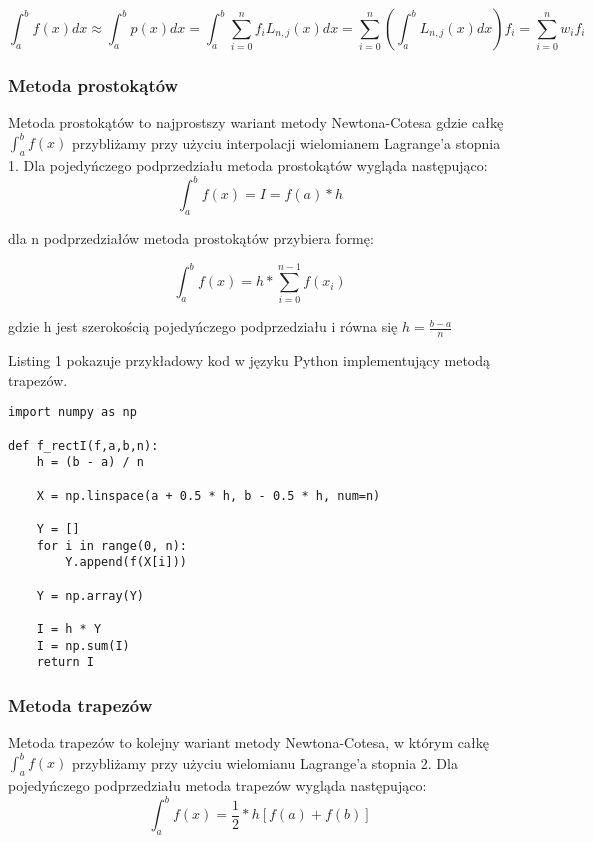 \documentclass[12pt,twoside]{article}
\begin{document}
\begin{equation}
\int_a^b f(x) dx \approx \int_a^b p(x) dx = \int_a^b \sum_{i=0}^{n} f_i L_{n,j}(x) dx = \sum_{i=0}^{n}(\int_a^b L_{n,j}(x)dx)f_i = \sum_{i=0}^{n} w_i f_i
\label{Eq:rownanie}
\end{equation}

\cite{web}

\clearpage	

\subsubsection{Metoda prostokątów}

Metoda prostokątów to najprostszy wariant metody Newtona-Cotesa gdzie całkę $\int_a^b f(x)$ przybliżamy przy użyciu interpolacji wielomianem Lagrange'a stopnia 1.
Dla pojedyńczego podprzedziału metoda prostokątów wygląda następująco:
\begin{equation}
\int_a^b f(x) = I = f(a)*h
\label{Eq:rownanie}
\end{equation}

dla n podprzedziałów metoda prostokątów przybiera formę:

\begin{equation}
\int_a^b f(x) = h * \sum_{i=0}^{n-1}f(x_i)
\label{Eq:rownanie}
\end{equation}

gdzie h jest szerokością pojedyńczego podprzedziału i równa się $h = \frac{b-a}{n}$  \cite{rect}

Listing 1 pokazuje przykładowy kod w języku Python implementujący metodą trapezów.
\begin{lstlisting}[caption={Kod w języku python implementujący metodę prostokątów}]
import numpy as np

def f_rectI(f,a,b,n):
    h = (b - a) / n

    X = np.linspace(a + 0.5 * h, b - 0.5 * h, num=n)

    Y = []
    for i in range(0, n):
        Y.append(f(X[i]))

    Y = np.array(Y)

    I = h * Y
    I = np.sum(I)
    return I
\end{lstlisting}
\label{Listing 1}



\subsubsection{Metoda trapezów}
Metoda trapezów to kolejny wariant metody Newtona-Cotesa, w którym całkę $\int_a^b f(x)$ przybliżamy przy użyciu wielomianu Lagrange'a stopnia 2.
Dla pojedyńczego podprzedziału metoda trapezów wygląda następująco:
\begin{equation}
\int_a^b f(x) =  \frac{1}{2}*h[f(a) + f(b)]
\label{Eq:rownanie}
\end{equation}
\end{document}
